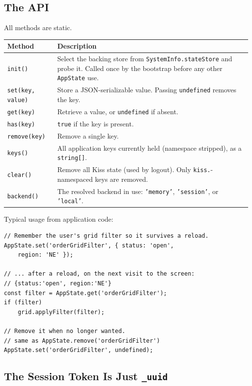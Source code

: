 \subsection{The API}
\label{sec:rs-appstate-api}

All methods are static.

\begin{longtable}{P{0.30\textwidth}P{0.62\textwidth}}
\toprule
\textbf{Method} & \textbf{Description} \\
\midrule
\endhead
\texttt{init()} & Select the backing store from \texttt{SystemInfo.stateStore} and probe it.  Called once by the bootstrap before any other \texttt{AppState} use. \\
\texttt{set(key, value)} & Store a JSON-serializable value.  Passing \texttt{undefined} removes the key. \\
\texttt{get(key)} & Retrieve a value, or \texttt{undefined} if absent. \\
\texttt{has(key)} & \texttt{true} if the key is present. \\
\texttt{remove(key)} & Remove a single key. \\
\texttt{keys()} & All application keys currently held (namespace stripped), as a \texttt{string[]}. \\
\texttt{clear()} & Remove all Kiss state (used by logout).  Only \texttt{kiss.}-namespaced keys are removed. \\
\texttt{backend()} & The resolved backend in use: \texttt{'memory'}, \texttt{'session'}, or \texttt{'local'}. \\
\bottomrule
\end{longtable}

\noindent
Typical usage from application code:

\begin{lstlisting}[style=javascript]
// Remember the user's grid filter so it survives a reload.
AppState.set('orderGridFilter', { status: 'open',
    region: 'NE' });

// ... after a reload, on the next visit to the screen:
// {status:'open', region:'NE'}
const filter = AppState.get('orderGridFilter');
if (filter)
    grid.applyFilter(filter);

// Remove it when no longer wanted.
// same as AppState.remove('orderGridFilter')
AppState.set('orderGridFilter', undefined);
\end{lstlisting}

\subsection{The Session Token Is Just \texttt{\_uuid}}
\label{sec:rs-appstate-uuid}


